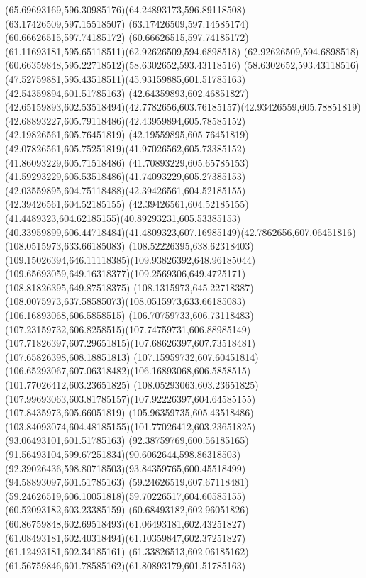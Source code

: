 {{		\curveto(65.69693169,596.30985176)(64.24893173,596.89118508)(63.17426509,597.15518507)
		\lineto(63.17426509,597.14585174)
		\lineto(60.66626515,597.74185172)
		\curveto(60.66626515,597.74185172)(61.11693181,595.65118511)(62.92626509,594.6898518)
		\curveto(62.92626509,594.6898518)(60.66359848,595.22718512)(58.6302652,593.43118516)
		\curveto(58.6302652,593.43118516)(47.52759881,595.43518511)(45.93159885,601.51785163)
		\lineto(42.54359894,601.51785163)
		\lineto(42.64359893,602.46851827)
		\curveto(42.65159893,602.53518494)(42.7782656,603.76185157)(42.93426559,605.78851819)
		\curveto(42.68893227,605.79118486)(42.43959894,605.78585152)(42.19826561,605.76451819)
		\lineto(42.19559895,605.76451819)
		\curveto(42.07826561,605.75251819)(41.97026562,605.73385152)(41.86093229,605.71518486)
		\curveto(41.70893229,605.65785153)(41.59293229,605.53518486)(41.74093229,605.27385153)
		\curveto(42.03559895,604.75118488)(42.39426561,604.52185155)(42.39426561,604.52185155)
		\curveto(42.39426561,604.52185155)(41.4489323,604.62185155)(40.89293231,605.53385153)
		\curveto(40.33959899,606.44718484)(41.4809323,607.16985149)(42.7862656,607.06451816)
		\moveto(108.0515973,633.66185083)
		\curveto(108.52226395,638.62318403)(109.15026394,646.11118385)(109.93826392,648.96185044)
		\curveto(109.65693059,649.16318377)(109.2569306,649.4725171)(108.81826395,649.87518375)
		\curveto(108.1315973,645.22718387)(108.0075973,637.58585073)(108.0515973,633.66185083)
		\moveto(106.16893068,606.5858515)
		\curveto(106.70759733,606.73118483)(107.23159732,606.8258515)(107.74759731,606.88985149)
		\curveto(107.71826397,607.29651815)(107.68626397,607.73518481)(107.65826398,608.18851813)
		\curveto(107.15959732,607.60451814)(106.65293067,607.06318482)(106.16893068,606.5858515)
		\moveto(101.77026412,603.23651825)
		\lineto(108.05293063,603.23651825)
		\curveto(107.99693063,603.81785157)(107.92226397,604.64585155)(107.8435973,605.66051819)
		\curveto(105.96359735,605.43518486)(103.84093074,604.48185155)(101.77026412,603.23651825)
		\moveto(93.06493101,601.51785163)
		\curveto(92.38759769,600.56185165)(91.56493104,599.67251834)(90.6062644,598.86318503)
		\curveto(92.39026436,598.80718503)(93.84359765,600.45518499)(94.58893097,601.51785163)
		\closepath
		\moveto(59.24626519,607.67118481)
		\curveto(59.24626519,606.10051818)(59.70226517,604.60585155)(60.52093182,603.23385159)
		\curveto(60.68493182,602.96051826)(60.86759848,602.69518493)(61.06493181,602.43251827)
		\curveto(61.08493181,602.40318494)(61.10359847,602.37251827)(61.12493181,602.34185161)
		\curveto(61.33826513,602.06185162)(61.56759846,601.78585162)(61.80893179,601.51785163)
}}
